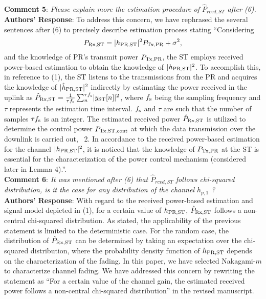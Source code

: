 \documentclass[12pt,a4wide,peerreview]{IEEEtran}
\newcommand{\tc}[1]{#1}
\begin{document}
\\
\textbf{\tc{Comment 5}}: 
\textit{
Please explain more the estimation procedure of  $\hat{P}_{rcvd,ST}$ after (6).
}
\\
\textbf{Authors' Response}:
To address this concern, we have rephrased the several sentences after (6) to precisely describe estimation process stating ``Considering
\begin{equation*}
\prcvd = \pgpo \ptran + \nps \label{eq:prcvd}, 
\end{equation*}
and the knowledge of PR's transmit power $P_{\text{Tx,PR}}$, the ST employs received power-based estimation to obtain the knowledge of $|h_{\text{PR,ST}}|^2$. 
To accomplish this, in reference to (1), the ST listens to the transmissions from the PR and acquires the knowledge of $|\hat{h}_{\text{PR,ST}}|^2$ indirectly by estimating the power received in the uplink as $\hat{P}_{\text{Rx,ST}} = {\frac{1}{{\tau f_{\text{s}}}}\sum_n^{\tau f_{\text{s}}}} {|y_{\text{ST}}[n]|^2}$, where $f_{\text{s}}$ being the sampling frequency and $\tau$ represents the estimation time interval. $f_{\text{s}}$ and $\tau$ are such that the number of samples $\tau f_{\text{s}}$ is an integer. The estimated received power $\hat{P}_{\text{Rx,ST}}$ is utilized to determine the control power $P_{\text{Tx,ST,cont}}$ at which the data transmission over the downlink is carried out, \figurename~2. In accordance to the received power-based estimation for the channel $|h_{\text{PR,ST}}|^2$, it is noticed that the knowledge of $P_{\text{Tx,PR}}$ at the ST is essential for the characterization of the power control mechanism (considered later in Lemma 4).''.
\\
\textbf{\tc{Comment 6}}: 
\textit{
It was mentioned after (6) that  $\hat{P}_{rcvd,ST}$ follows chi-squared distribution, is it the case for any distribution of the channel $h_{p,1}$ ?
}
\\
\textbf{Authors' Response}:
With regard to the received power-based estimation and signal model depicted in (1), for a certain value of $h_{\text{PR,ST}}$, $\hat{P}_{\text{Rx,ST}}$ follows a non-central chi-squared distribution. As stated, the applicability of the previous statement is limited to the deterministic case. For the random case, the distribution of $\hat{P}_{\text{Rx,ST}}$ can be determined by taking an expectation over the chi-squared distribution, where the probability density function of $h_{\text{PR,ST}}$ depends on the characterization of the fading. In this paper, we have selected Nakagami-$m$ to characterize channel fading. We have addressed this concern by rewriting the statement as ``For a certain value of the channel gain, the estimated received power follows a non-central chi-squared distribution'' in the revised manuscript.   
\\
\end{document}
